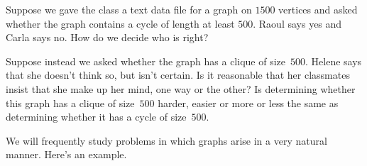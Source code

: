 \begin{example}
Suppose we gave the class a text data file for a graph
on $1500$ vertices and asked whether the graph contains
a cycle of length at least $500$.  Raoul says yes and
Carla says no. How do we decide who is right?

Suppose instead we asked whether the graph has a clique of
size~$500$.  Helene says that she doesn't think so, but isn't
certain.  Is it reasonable that her classmates insist that
she make up her mind, one way or the other?  Is determining whether
this graph has a clique of size~$500$ harder, easier or
more or less the same as determining whether
it has a cycle of size~$500$.
\end{example}

We will frequently study problems in which graphs
arise in a very natural manner.  Here's an example.

